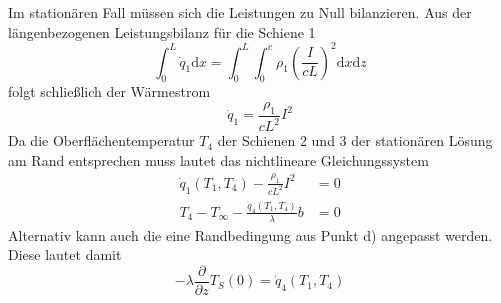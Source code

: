 Im stationären Fall müssen sich die Leistungen zu Null bilanzieren. Aus der längenbezogenen Leistungsbilanz für die Schiene 1
\[
	\int_{0}^{L}\dot{q}_1\text{d}x = \int_{0}^{L}\int_{0}^{c}\rho_1\left(\frac{I}{cL}\right)^2\text{d}x\text{d}z
\]
folgt schließlich der Wärmestrom
\[
	\dot{q}_1 = \frac{\rho_1}{cL^2}I^2
\]
Da die Oberflächentemperatur $T_4$ der Schienen 2 und 3 der stationären Lösung am Rand entsprechen muss lautet das nichtlineare Gleichungssystem
\begin{align*}
	\dot{q}_1(T_1,T_4) - \frac{\rho_1}{cL^2}I^2 &= 0 \\
	T_4 - T_\infty - \frac{\dot{q}_4(T_1,T_4)}{\lambda}b &= 0
\end{align*}
Alternativ kann auch die eine Randbedingung aus Punkt d) angepasst werden. Diese lautet damit
\[
	-\lambda\frac{\partial}{\partial z}T_S(0) = \dot{q}_4(T_1,T_4)
\]